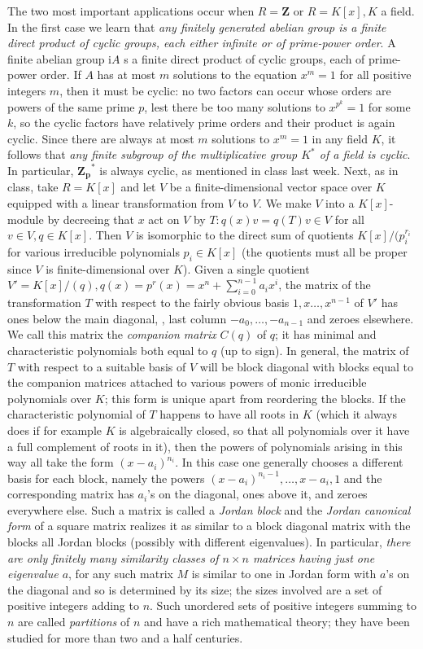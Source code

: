 \documentclass[10pt]{article}
\begin{document}
The two most important applications occur when $R=\mathbf{Z}$ or
$R=K[x], K$ a field. In the first case we learn that {\sl any finitely
  generated abelian group is a finite direct product of cyclic groups,
  each either infinite or of prime-power order}. A finite abelian group
i$A$ s a finite direct product of cyclic groups, each of prime-power
order. If $A$ has at most $m$ solutions to the equation $x^m = 1$ for
all positive integers $m$, then it must be cyclic: no two factors can
occur whose orders are powers of the same prime $p$, lest there be too
many solutions to $x^{p^k}= 1$ for some $k$, so the cyclic factors have
relatively prime orders and their product is again cyclic. Since there
are always at most $m$ solutions to $x^m = 1$ in any field $K$, it
follows that {\sl any finite subgroup of the multiplicative group $K^*$
  of a field is cyclic}. In particular, $\mathbf{Z_p}^*$ is always
cyclic, as mentioned in class last week. Next, as in class, take
$R=K[x]$ and let $V$ be a finite-dimensional vector space over $K$
equipped with a linear transformation from $V$ to $V$. We make $V$ into
a $K[x]$-module by decreeing that $x$ act on $V$ by $T: q(x) v = q(T)
v\in V$ for all $v\in V, q\in K[x]$. Then $V$ is isomorphic to the
direct sum of quotients $K[x]/(p_i^{r_i}$ for various irreducible
polynomials $p_i\in K[x]$ (the quotients must all be proper since $V$ is
finite-dimensional over $K$). Given a single quotient $V'=K[x]/(q), q(x)
= p^r(x) = x^n + \sum_{i=0}^{n-1} a_i x^i$, the matrix of the
transformation $T$ with respect to the fairly obvious basis
$1,x\ldots,x^{n-1}$ of $V'$ has ones below the main diagonal, , last
column $-a_0,\ldots,-a_{n-1}$ and zeroes elsewhere. We call this matrix
the {\sl companion matrix} $C(q)$ of $q$; it has minimal and
characteristic polynomials both equal to $q$ (up to sign). In general,
the matrix of $T$ with respect to a suitable basis of $V$ will be block
diagonal with blocks equal to the companion matrices attached to various
powers of monic irreducible polynomials over $K$; this form is unique
apart from reordering the blocks. If the characteristic polynomial of
$T$ happens to have all roots in $K$ (which it always does if for
example $K$ is algebraically closed, so that all polynomials over it
have a full complement of roots in it), then the powers of polynomials
arising in this way all take the form $(x-a_i)^{n_i}$. In this case one
generally chooses a different basis for each block, namely the powers
$(x-a_i)^{n_i-1},\ldots,x-a_i,1$ and the corresponding matrix has
$a_i$'s on the diagonal, ones above it, and zeroes everywhere else. Such
a matrix is called a {\sl Jordan block} and the {\sl Jordan canonical
  form} of a square matrix realizes it as similar to a block diagonal
matrix with the blocks all Jordan blocks (possibly with different
eigenvalues). In particular, {\sl there are only finitely many
  similarity classes of $n\times n$ matrices having just one eigenvalue
  $a$}, for any such matrix $M$ is similar to one in Jordan form with
$a$'s on the diagonal and so is determined by its size; the sizes
involved are a set of positive integers adding to $n$. Such unordered
sets of positive integers summing to $n$ are called {\sl partitions} of
$n$ and have a rich mathematical theory; they have been studied for more
than two and a half centuries.
\end{document}
